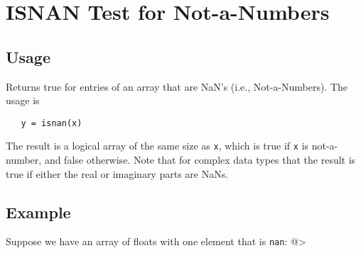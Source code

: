 \section{ISNAN Test for Not-a-Numbers}

\subsection{Usage}

Returns true for entries of an array that are NaN's (i.e.,
Not-a-Numbers).  The usage is
\begin{verbatim}
   y = isnan(x)
\end{verbatim}
The result is a logical array of the same size as \verb|x|,
which is true if \verb|x| is not-a-number, and false otherwise.
Note that for complex data types that
the result is true if either the real or imaginary parts
are NaNs.
\subsection{Example}

Suppose we have an array of floats with one element that
is \verb|nan|:
@>

